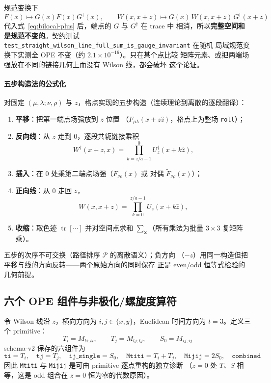 \documentclass[11pt,a4paper]{ctexart}
\newcommand{\trc}{\operatorname{tr}}
\newcommand{\code}[1]{\texttt{#1}}
\begin{document}
规范变换下
\begin{equation}
F(x)\mapsto G(x)F(x)G^\dagger(x), \qquad
W(x,x+z)\mapsto G(x)\,W(x,x+z)\,G^\dagger(x+z)
\end{equation}
代入式~\eqref{eq:bilocal-plus} 后，端点的 $G$ 与 $G^\dagger$ 在 trace 中
相消，所以\textbf{完整空间和是规范不变的}。契约测试
\code{test\_straight\_wilson\_line\_full\_sum\_is\_gauge\_invariant} 在随机
局域规范变换下实测全 OPE 不变（约 $2.1\times10^{-16}$）。只在某个点比较
矩阵元素、或把两端场强放在不同的链接几何上而没有 Wilson 线，都会破坏
这个论证。

\paragraph{五步构造法的公式化}对固定 $(\mu,\lambda;\nu,\rho)$ 与
$z$，格点实现的五步构造（连续理论到离散的逐段翻译）：
\begin{enumerate}
  \item \textbf{平移}：把第一端点场强放到 $z$ 位置
  （$F_{\mu\lambda}(x+z\hat z)$，格点上为整场 \code{roll}）；
  \item \textbf{反向线}：从 $z$ 走到 $0$，逐段共轭链接乘积
  \begin{equation}
  W^\dagger(x+z,x) = \prod_{k=z/a-1}^{0} U_z^\dagger(x+k\hat z),
  \end{equation}
  \item \textbf{插入}：在 $0$ 处乘第二端点场强（$F_{\nu\rho}(x)$ 或
  对偶 $\widetilde F_{\nu\rho}(x)$）；
  \item \textbf{正向线}：从 $0$ 走回 $z$，
  \begin{equation}
  W(x,x+z) = \prod_{k=0}^{z/a-1} U_z(x+k\hat z),
  \end{equation}
  \item \textbf{收缩}：取色迹 $\trc[\cdots]$ 并对空间点求和
  $\sum_{\boldsymbol x}$（所有乘法为批量 $3\times3$ 复矩阵乘）。
\end{enumerate}
五步的次序不可交换（路径排序 $\mathcal P$ 的离散语义）；负方向
（$-z$）用同一构造但把平移与线的方向反转——两个原始方向的同时保存
正是 even/odd 恒等式检验的几何前提。

\subsection{六个 OPE 组件与非极化/螺旋度算符}
\label{sec:unpol-hel}

令 Wilson 线沿 $z$，横向方向为 $i,j\in\{x,y\}$，Euclidean 时间方向为
$t=3$。定义三个 primitive：
\begin{equation}
T_i = M_{ti;ti}, \qquad T_j = M_{tj;tj}, \qquad S_0 = M_{ij;ij}
\end{equation}
schema-v2 保存的六组件为
\begin{equation}\label{eq:components}
\code{ti}=T_i,\quad \code{tj}=T_j,\quad \code{ij\_single}=S_0,\quad
\code{Mtiti}=T_i+T_j,\quad \code{Mijij}=2S_0,\quad \code{combined}
\end{equation}
因此 \code{Mtiti} 与 \code{Mijij} 是可由 primitive 逐点重构的独立诊断
（$z=0$ 处 $T$、$S$ 相等，这是 odd 组合在 $z=0$ 恒为零的代数原因）。
\end{document}
